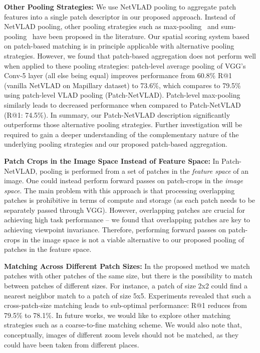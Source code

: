 \textbf{Other Pooling Strategies:}
We use NetVLAD pooling to aggregate patch features into a single patch descriptor in our proposed approach. Instead of NetVLAD pooling, other pooling strategies such as max-pooling~\cite{tolias2015particular} and sum-pooling~\cite{babenko2015aggregating} have been proposed in the literature. Our spatial scoring system based on patch-based matching is in principle applicable with alternative pooling strategies. However, we found that patch-based aggregation does not perform well when applied to these pooling strategies: patch-level average pooling of VGG's Conv-5 layer (all else being equal)  improves performance from 60.8\% R@1 (vanilla NetVLAD on Mapillary dataset) to 73.6\%, which compares to 79.5\% using patch-level VLAD pooling (Patch-NetVLAD). Patch-level max-pooling similarly leads to decreased performance when compared to Patch-NetVLAD (R@1: 74.5\%). In summary, our Patch-NetVLAD description significantly outperforms those alternative pooling strategies. Further investigation will be required to gain a deeper understanding of the complementary nature of the underlying pooling strategies and our proposed patch-based aggregation.

\textbf{Patch Crops in the Image Space Instead of Feature Space:} In Patch-NetVLAD, pooling is performed from a set of patches in the \emph{feature space} of an image. One could instead perform forward passes on patch-crops in the \emph{image space}. The main problem with this approach is that processing overlapping patches is prohibitive in terms of compute and storage (as each patch needs to be separately passed through VGG). However, overlapping patches are crucial for achieving high task performance -- we found that overlapping patches are key to achieving viewpoint invariance. Therefore, performing forward passes on patch-crops in the image space is not a viable alternative to our proposed pooling of patches in the feature space.

\textbf{Matching Across Different Patch Sizes:}
In the proposed method we match patches with other patches of the same size, but there is the possibility to match between patches of different sizes. For instance, a patch of size 2x2 could find a nearest neighbor match to a patch of size 5x5. Experiments revealed that such a cross-patch-size matching leads to sub-optimal performance: R@1 reduces from 79.5\% to 78.1\%. In future works, we would like to explore other matching strategies such as a coarse-to-fine matching scheme. We would also note that, conceptually, images of different zoom levels should not be matched, as they could have been taken from different places.

